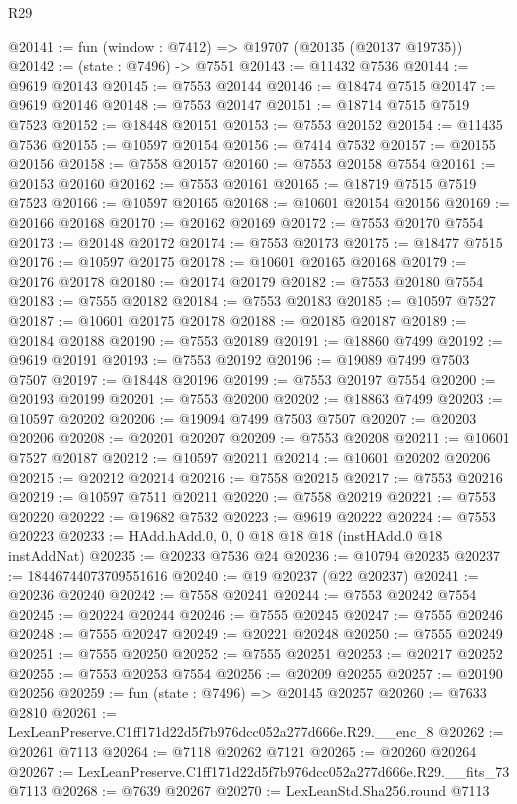 \begin{lexlean}{R29}
\begin{coremodule}
@20141 := fun (window : @7412) => @19707 (@20135 (@20137 @19735))
@20142 := (state : @7496) -> @7551
@20143 := @11432 @7536
@20144 := @9619 @20143
@20145 := @7553 @20144
@20146 := @18474 @7515
@20147 := @9619 @20146
@20148 := @7553 @20147
@20151 := @18714 @7515 @7519 @7523
@20152 := @18448 @20151
@20153 := @7553 @20152
@20154 := @11435 @7536
@20155 := @10597 @20154
@20156 := @7414 @7532
@20157 := @20155 @20156
@20158 := @7558 @20157
@20160 := @7553 @20158 @7554
@20161 := @20153 @20160
@20162 := @7553 @20161
@20165 := @18719 @7515 @7519 @7523
@20166 := @10597 @20165
@20168 := @10601 @20154 @20156
@20169 := @20166 @20168
@20170 := @20162 @20169
@20172 := @7553 @20170 @7554
@20173 := @20148 @20172
@20174 := @7553 @20173
@20175 := @18477 @7515
@20176 := @10597 @20175
@20178 := @10601 @20165 @20168
@20179 := @20176 @20178
@20180 := @20174 @20179
@20182 := @7553 @20180 @7554
@20183 := @7555 @20182
@20184 := @7553 @20183
@20185 := @10597 @7527
@20187 := @10601 @20175 @20178
@20188 := @20185 @20187
@20189 := @20184 @20188
@20190 := @7553 @20189
@20191 := @18860 @7499
@20192 := @9619 @20191
@20193 := @7553 @20192
@20196 := @19089 @7499 @7503 @7507
@20197 := @18448 @20196
@20199 := @7553 @20197 @7554
@20200 := @20193 @20199
@20201 := @7553 @20200
@20202 := @18863 @7499
@20203 := @10597 @20202
@20206 := @19094 @7499 @7503 @7507
@20207 := @20203 @20206
@20208 := @20201 @20207
@20209 := @7553 @20208
@20211 := @10601 @7527 @20187
@20212 := @10597 @20211
@20214 := @10601 @20202 @20206
@20215 := @20212 @20214
@20216 := @7558 @20215
@20217 := @7553 @20216
@20219 := @10597 @7511 @20211
@20220 := @7558 @20219
@20221 := @7553 @20220
@20222 := @19682 @7532
@20223 := @9619 @20222
@20224 := @7553 @20223
@20233 := HAdd.hAdd.{0, 0, 0} @18 @18 @18 (instHAdd.{0} @18 instAddNat)
@20235 := @20233 @7536 @24
@20236 := @10794 @20235
@20237 := 18446744073709551616
@20240 := @19 @20237 (@22 @20237)
@20241 := @20236 @20240
@20242 := @7558 @20241
@20244 := @7553 @20242 @7554
@20245 := @20224 @20244
@20246 := @7555 @20245
@20247 := @7555 @20246
@20248 := @7555 @20247
@20249 := @20221 @20248
@20250 := @7555 @20249
@20251 := @7555 @20250
@20252 := @7555 @20251
@20253 := @20217 @20252
@20255 := @7553 @20253 @7554
@20256 := @20209 @20255
@20257 := @20190 @20256
@20259 := fun (state : @7496) => @20145 @20257
@20260 := @7633 @2810
@20261 := LexLeanPreserve.C1ff171d22d5f7b976dcc052a277d666e.R29.__enc_8
@20262 := @20261 @7113
@20264 := @7118 @20262 @7121
@20265 := @20260 @20264
@20267 := LexLeanPreserve.C1ff171d22d5f7b976dcc052a277d666e.R29.__fits_73 @7113
@20268 := @7639 @20267
@20270 := LexLeanStd.Sha256.round @7113

\end{coremodule}
\end{lexlean}
